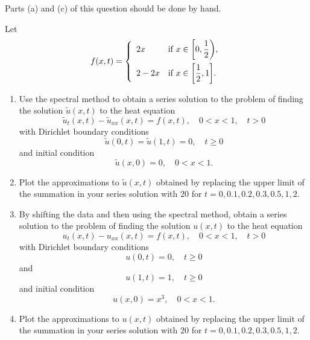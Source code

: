 Parts (a) and (c) of this question should be done by hand.

Let
\[
f(x,t)=\left\{\begin{array}{ll}
2x & \displaystyle{\mbox{if }x\in\left[0,{1 \over 2}\right)},
\\[10pt]
2-2x & \displaystyle{\mbox{if }x\in\left[{1 \over 2},1\right]}.
\end{array}\right.
\]
\begin{enumerate}
\item Use the spectral method to obtain a series solution to the problem of finding the solution $\tilde{u}(x,t)$ to the heat equation
\[
\tilde{u}_t(x,t)-\tilde{u}_{xx}(x,t) = f(x,t),\quad 0<x<1,\quad t>0
\]
with Dirichlet boundary conditions
\[
\tilde{u}(0,t) = \tilde{u}(1,t) = 0,\quad t\ge0
\]
and initial condition
\[
\tilde{u}(x,0)=0,\quad 0<x<1.
\]

\item Plot the approximations to $\tilde{u}(x,t)$ obtained by replacing the upper limit of the summation in your series solution with $20$ for $t=0,0.1,0.2,0.3,0.5,1,2$.

\item By shifting the data and then using the spectral method, obtain a series solution to the problem of finding the solution $u(x,t)$ to the heat equation
\[
u_t(x,t)-u_{xx}(x,t) = f(x,t),\quad 0<x<1,\quad t>0
\]
with Dirichlet boundary conditions
\[
u(0,t) =0,\quad t\ge0
\]
and
\[
u(1,t) = 1,\quad t\ge0
\]
and initial condition
\[
u(x,0)=x^3,\quad 0<x<1.
\]

\item Plot the approximations to $u(x,t)$ obtained by replacing the upper limit of the summation in your series solution with $20$ for $t=0,0.1,0.2,0.3,0.5,1,2$.
\end{enumerate}


